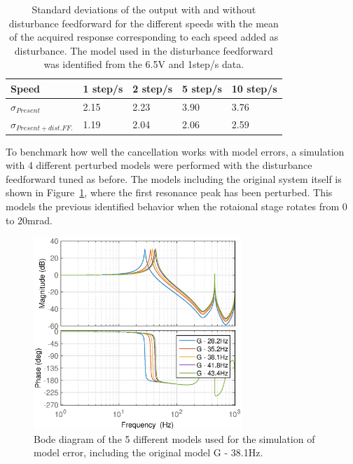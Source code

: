 \begin{table}[h!]
  \centering
  \begin{tabular}{| l | l | l | l | l |}
    \hline
      Speed & 1 step/s & 2 step/s & 5 step/s & 10 step/s\\ \hline
      $\sigma_{Present}$ & 2.15 & 2.23 & 3.90 & 3.76\\
      $\sigma_{Present + dist.FF.}$ & 1.19 & 2.04 & 2.06 & 2.59\\
    \hline
  \end{tabular}
  \caption{\label{tab:std_diff_speed} Standard deviations of the output with and without disturbance feedforward for the different speeds with the mean of the acquired response corresponding to each speed added as disturbance. The model used in the disturbance feedforward was identified from the 6.5V and 1step/s data.}
\end{table}

\FloatBarrier
To benchmark how well the cancellation works with model errors, a simulation with 4 different perturbed models were performed with the disturbance feedforward tuned as before. The models including the original system itself is shown in Figure~\ref{fig:hc_me_bode}, where the first resonance peak has been perturbed. This models the previous identified behavior when the rotaional stage rotates from 0 to 20mrad.

\begin{figure}[h!]
  \centering
  \includegraphics[width=0.7\textwidth]{fig/matlab/bode_rfdc_modelerror.eps}
  \caption{\label{fig:hc_me_bode} Bode diagram of the 5 different models used for the simulation of model error, including the original model G - 38.1Hz.}
\end{figure}

